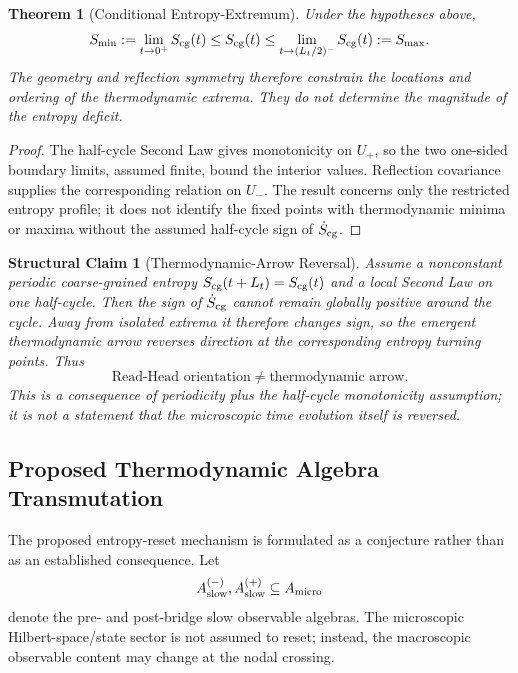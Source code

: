 \documentclass[11pt]{article}
\theoremstyle{canonmath}
\newtheorem{theorem}{Theorem}[section]
\theoremstyle{canonpostulate}
\theoremstyle{canonclaim}
\newtheorem{structuralclaim}{Structural Claim}[section]
\def\mathcal#1{#1}%
\begin{document}
\begin{theorem}[Conditional Entropy-Extremum] \label{thm:entropy_extremum}
Under the hypotheses above,
\begin{equation}
S_{\min}:=\lim_{t\to0^+}S_{\rm cg}(t)\le S_{\rm cg}(t)\le\lim_{t\to(L_t/2)^-}S_{\rm cg}(t):=S_{\max}.
\end{equation}
The geometry and reflection symmetry therefore constrain the locations and ordering of the thermodynamic extrema. They do not determine the magnitude of the entropy deficit.
\end{theorem}
\begin{proof}
The half-cycle Second Law gives monotonicity on $U_+$, so the two one-sided boundary limits, assumed finite, bound the interior values. Reflection covariance supplies the corresponding relation on $U_-$. The result concerns only the restricted entropy profile; it does not identify the fixed points with thermodynamic minima or maxima without the assumed half-cycle sign of $\dot S_{\rm cg}$.
\end{proof}

\begin{structuralclaim}[Thermodynamic-Arrow Reversal] \label{claim:arrow_reversal}
Assume a nonconstant periodic coarse-grained entropy $S_{\rm cg}(t+L_t)=S_{\rm cg}(t)$ and a local Second Law on one half-cycle. Then the sign of $\dot S_{\rm cg}$ cannot remain globally positive around the cycle. Away from isolated extrema it therefore changes sign, so the emergent thermodynamic arrow reverses direction at the corresponding entropy turning points. Thus
\begin{equation}
\boxed{\text{Read-Head orientation}\neq\text{thermodynamic arrow}.}
\end{equation}
This is a consequence of periodicity plus the half-cycle monotonicity assumption; it is not a statement that the microscopic time evolution itself is reversed.
\end{structuralclaim}

\subsection{Proposed Thermodynamic Algebra Transmutation}
The proposed entropy-reset mechanism is formulated as a conjecture rather than as an established consequence. Let
\begin{equation}
\mathcal A_{\rm slow}^{(-)},\mathcal A_{\rm slow}^{(+)}\subseteq\mathcal A_{\rm micro}
\end{equation}
denote the pre- and post-bridge slow observable algebras. The microscopic Hilbert-space/state sector is not assumed to reset; instead, the macroscopic observable content may change at the nodal crossing.
\end{document}
